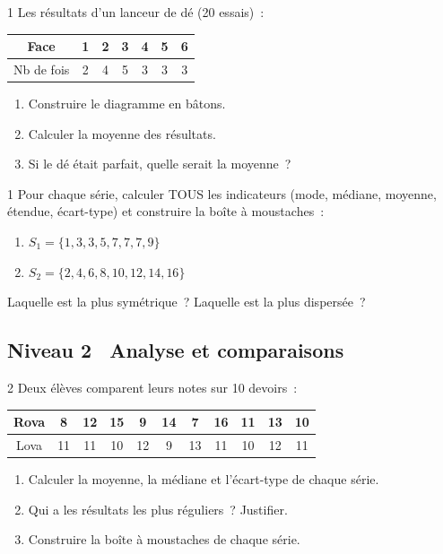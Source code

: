 \begin{exo}{1}
Les r\'esultats d'un lanceur de d\'e (20 essais)~:
\begin{center}
\begin{tabular}{|c|cccccc|}
\hline
\rowcolor{BN!10}
Face & 1 & 2 & 3 & 4 & 5 & 6 \\
\hline
Nb de fois & 2 & 4 & 5 & 3 & 3 & 3 \\
\hline
\end{tabular}
\end{center}
\begin{enumerate}
  \item Construire le diagramme en b\^atons.
  \item Calculer la moyenne des r\'esultats.
  \item Si le d\'e \'etait parfait, quelle serait la moyenne~?
\end{enumerate}
\end{exo}

\begin{exo}{1}
Pour chaque s\'erie, calculer TOUS les indicateurs (mode, m\'ediane,
moyenne, \'etendue, \'ecart-type) et construire la bo\^ite \`a moustaches~:
\begin{enumerate}
  \item $S_1 = \{1, 3, 3, 5, 7, 7, 7, 9\}$
  \item $S_2 = \{2, 4, 6, 8, 10, 12, 14, 16\}$
\end{enumerate}
Laquelle est la plus \og sym\'etrique\fg~? Laquelle est la plus dispers\'ee~?
\end{exo}

\subsection*{\quad Niveau 2 \textemdash\ Analyse et comparaisons}

\begin{exo}{2}
Deux \'el\`eves comparent leurs notes sur 10 devoirs~:
\begin{center}
\begin{tabular}{|c|cccccccccc|}
\hline
\rowcolor{BN!10} Rova & 8 & 12 & 15 & 9 & 14 & 7 & 16 & 11 & 13 & 10 \\
\hline
Lova & 11 & 11 & 10 & 12 & 9 & 13 & 11 & 10 & 12 & 11 \\
\hline
\end{tabular}
\end{center}
\begin{enumerate}
  \item Calculer la moyenne, la m\'ediane et l'\'ecart-type de chaque s\'erie.
  \item Qui a les r\'esultats les plus r\'eguliers~? Justifier.
  \item Construire la bo\^ite \`a moustaches de chaque s\'erie.
\end{enumerate}
\end{exo}

